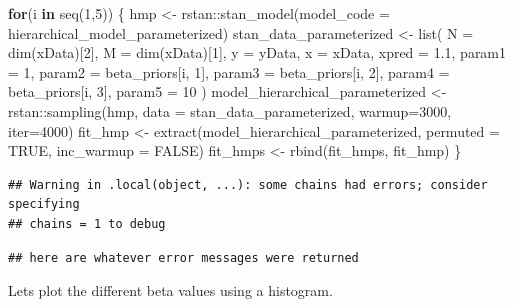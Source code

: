 \documentclass[
]{article}
\newenvironment{Shaded}{\begin{snugshade}}{\end{snugshade}}
\newcommand{\AttributeTok}[1]{\textcolor[rgb]{0.77,0.63,0.00}{#1}}
\newcommand{\ConstantTok}[1]{\textcolor[rgb]{0.00,0.00,0.00}{#1}}
\newcommand{\ControlFlowTok}[1]{\textcolor[rgb]{0.13,0.29,0.53}{\textbf{#1}}}
\newcommand{\DecValTok}[1]{\textcolor[rgb]{0.00,0.00,0.81}{#1}}
\newcommand{\FloatTok}[1]{\textcolor[rgb]{0.00,0.00,0.81}{#1}}
\newcommand{\FunctionTok}[1]{\textcolor[rgb]{0.00,0.00,0.00}{#1}}
\newcommand{\NormalTok}[1]{#1}
\newcommand{\OtherTok}[1]{\textcolor[rgb]{0.56,0.35,0.01}{#1}}
\newcommand{\SpecialCharTok}[1]{\textcolor[rgb]{0.00,0.00,0.00}{#1}}
\begin{document}
\begin{Shaded}
\begin{Highlighting}[]
\ControlFlowTok{for}\NormalTok{(i }\ControlFlowTok{in} \FunctionTok{seq}\NormalTok{(}\DecValTok{1}\NormalTok{,}\DecValTok{5}\NormalTok{)) \{}
\NormalTok{  hmp }\OtherTok{\textless{}{-}}\NormalTok{ rstan}\SpecialCharTok{::}\FunctionTok{stan\_model}\NormalTok{(}\AttributeTok{model\_code =}\NormalTok{ hierarchical\_model\_parameterized)}
\NormalTok{  stan\_data\_parameterized }\OtherTok{\textless{}{-}} \FunctionTok{list}\NormalTok{(}
      \AttributeTok{N =} \FunctionTok{dim}\NormalTok{(xData)[}\DecValTok{2}\NormalTok{],}
      \AttributeTok{M =} \FunctionTok{dim}\NormalTok{(xData)[}\DecValTok{1}\NormalTok{],}
      \AttributeTok{y =}\NormalTok{ yData,}
      \AttributeTok{x =}\NormalTok{ xData,}
      \AttributeTok{xpred =} \FloatTok{1.1}\NormalTok{,}
      \AttributeTok{param1 =} \DecValTok{1}\NormalTok{,}
      \AttributeTok{param2 =}\NormalTok{ beta\_priors[i, }\DecValTok{1}\NormalTok{],}
      \AttributeTok{param3 =}\NormalTok{ beta\_priors[i, }\DecValTok{2}\NormalTok{],}
      \AttributeTok{param4 =}\NormalTok{ beta\_priors[i, }\DecValTok{3}\NormalTok{],}
      \AttributeTok{param5 =} \DecValTok{10}
\NormalTok{  )}
\NormalTok{  model\_hierarchical\_parameterized }\OtherTok{\textless{}{-}}\NormalTok{ rstan}\SpecialCharTok{::}\FunctionTok{sampling}\NormalTok{(hmp, }
                \AttributeTok{data =}\NormalTok{ stan\_data\_parameterized, }\AttributeTok{warmup=}\DecValTok{3000}\NormalTok{, }\AttributeTok{iter=}\DecValTok{4000}\NormalTok{)}
\NormalTok{  fit\_hmp }\OtherTok{\textless{}{-}} \FunctionTok{extract}\NormalTok{(model\_hierarchical\_parameterized, }
                     \AttributeTok{permuted =} \ConstantTok{TRUE}\NormalTok{, }\AttributeTok{inc\_warmup =} \ConstantTok{FALSE}\NormalTok{)}
\NormalTok{  fit\_hmps }\OtherTok{\textless{}{-}} \FunctionTok{rbind}\NormalTok{(fit\_hmps, fit\_hmp)}
\NormalTok{\}}
\end{Highlighting}
\end{Shaded}

\begin{verbatim}
## Warning in .local(object, ...): some chains had errors; consider specifying
## chains = 1 to debug
\end{verbatim}

\begin{verbatim}
## here are whatever error messages were returned
\end{verbatim}

Lets plot the different beta values using a histogram.
\end{document}

